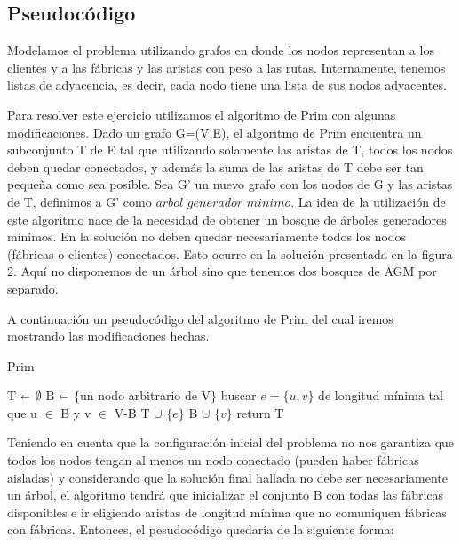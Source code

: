 \subsection{Pseudocódigo}

Modelamos el problema utilizando grafos en donde los nodos representan a los clientes y a las fábricas y las aristas con peso a las rutas. Internamente, tenemos listas de adyacencia, es decir, cada nodo tiene una lista de sus nodos adyacentes.

Para resolver este ejercicio utilizamos el algoritmo de Prim con algunas modificaciones. Dado un grafo G=(V,E), el algoritmo de Prim encuentra un subconjunto T de E tal que utilizando solamente las aristas de T, todos los nodos deben quedar conectados, y además la suma de las aristas de T debe ser tan pequeña como sea posible. Sea G' un nuevo grafo con los nodos de G y las aristas de T, definimos a G' como $arbol$ $generador$ $minimo$. La idea de la utilización de este algoritmo nace de la necesidad de obtener un bosque de árboles generadores mínimos. En la solución no deben quedar necesariamente todos los nodos (fábricas o clientes) conectados. Esto ocurre en la solución presentada en la figura 2. Aquí no disponemos de un árbol sino que tenemos dos bosques de AGM por separado.

A continuación un pseudocódigo del algoritmo de Prim del cual iremos mostrando las modificaciones hechas.

\begin{algorithm}[H]
\caption{Prim}\label{ej1}
\begin{algorithmic}[1]
	\State T  $\shortleftarrow$ $\emptyset$
	\State B $\shortleftarrow$ $\{$un nodo arbitrario de V$\}$
		\State buscar $e=\{u,v\}$ de longitud mínima tal que u $\in$ B y v $\in$ V-B
		\State T $\cup$ $\{e\}$
		\State B $\cup$ $\{v\}$
	\EndWhile
	\State return T
\EndProcedure
\end{algorithmic}
\end{algorithm}


Teniendo en cuenta que la configuración inicial del problema no nos garantiza que todos los nodos tengan al menos un nodo conectado (pueden haber fábricas aisladas) y considerando que la solución final hallada no debe ser necesariamente un árbol, el algoritmo tendrá que  inicializar el conjunto B con todas las fábricas disponibles e ir eligiendo aristas de longitud mínima que no comuniquen fábricas con fábricas. Entonces, el pesudocódigo quedaría de la siguiente forma:

